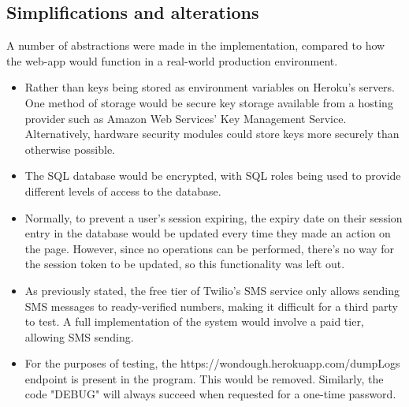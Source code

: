 \subsection{Simplifications and alterations}

A number of abstractions were made in the implementation, compared to how the web-app would function in a real-world production environment. 

\begin{itemize}

    \item Rather than keys being stored as environment variables on Heroku's servers. One method of storage would be secure key storage available from a hosting provider such as Amazon Web Services' Key Management Service. Alternatively, hardware security modules could store keys more securely than otherwise possible.

    \item The SQL database would be encrypted, with SQL roles being used to provide different levels of access to the database.

    \item Normally, to prevent a user's session expiring, the expiry date on their session entry in the database would be updated every time they made an action on the page. However, since no operations can be performed, there's no way for the session token to be updated, so this functionality was left out.

    \item As previously stated, the free tier of Twilio's SMS service only allows sending SMS messages to ready-verified numbers, making it difficult for a third party to test. A full implementation of the system would involve a paid tier, allowing SMS sending.

    \item For the purposes of testing, the {https://wondough.herokuapp.com/dumpLogs} endpoint is present in the program. This would be removed. Similarly, the code "DEBUG" will always succeed when requested for a one-time password. 

\end{itemize}